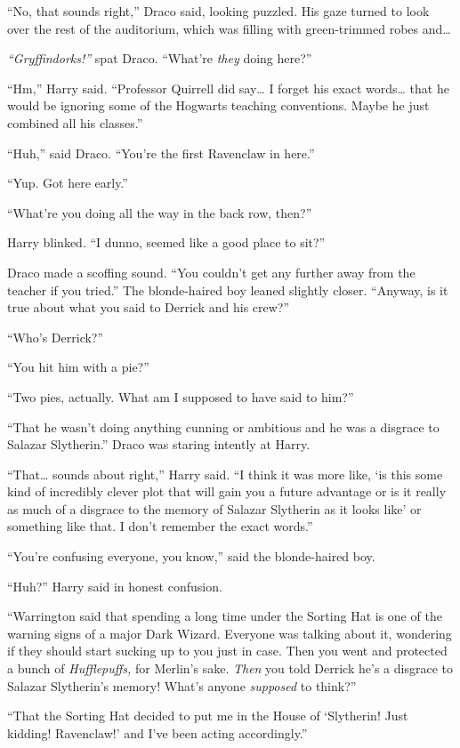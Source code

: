 ``No, that sounds right,'' Draco said, looking puzzled. His gaze turned
to look over the rest of the auditorium, which was filling with
green-trimmed robes and\ldots{}

\emph{``Gryffindorks!''} spat Draco. ``What're \emph{they} doing here?''

``Hm,'' Harry said. ``Professor Quirrell did say\ldots{} I forget his
exact words\ldots{} that he would be ignoring some of the Hogwarts
teaching conventions. Maybe he just combined all his classes.''

``Huh,'' said Draco. ``You're the first Ravenclaw in here.''

``Yup. Got here early.''

``What're you doing all the way in the back row, then?''

Harry blinked. ``I dunno, seemed like a good place to sit?''

Draco made a scoffing sound. ``You couldn't get any further away from
the teacher if you tried.'' The blonde-haired boy leaned slightly
closer. ``Anyway, is it true about what you said to Derrick and his
crew?''

``Who's Derrick?''

``You hit him with a pie?''

``Two pies, actually. What am I supposed to have said to him?''

``That he wasn't doing anything cunning or ambitious and he was a
disgrace to Salazar Slytherin.'' Draco was staring intently at Harry.

``That\ldots{} sounds about right,'' Harry said. ``I think it was more
like, `is this some kind of incredibly clever plot that will gain you a
future advantage or is it really as much of a disgrace to the memory of
Salazar Slytherin as it looks like' or something like that. I don't
remember the exact words.''

``You're confusing everyone, you know,'' said the blonde-haired boy.

``Huh?'' Harry said in honest confusion.

``Warrington said that spending a long time under the Sorting Hat is one
of the warning signs of a major Dark Wizard. Everyone was talking about
it, wondering if they should start sucking up to you just in case. Then
you went and protected a bunch of \emph{Hufflepuffs,} for Merlin's sake.
\emph{Then} you told Derrick he's a disgrace to Salazar Slytherin's
memory! What's anyone \emph{supposed} to think?''

``That the Sorting Hat decided to put me in the House of `Slytherin!
Just kidding! Ravenclaw!' and I've been acting accordingly.''

